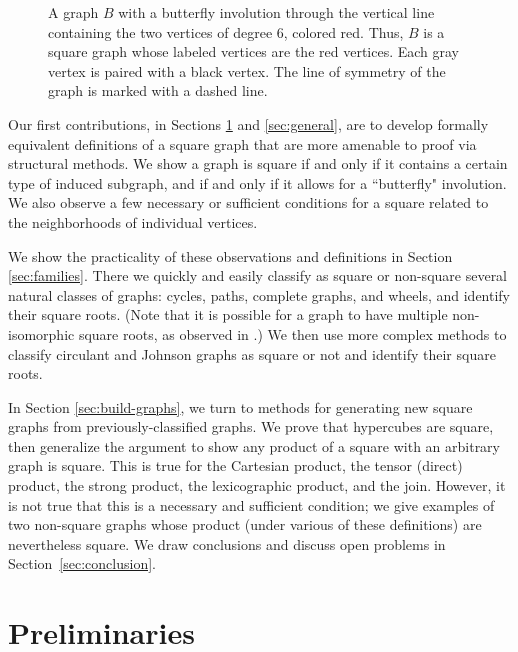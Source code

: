 \documentclass{article}
\theoremstyle{definition}
\begin{document}
\begin{figure}[htb]
    \caption{A graph $B$ with a butterfly involution through the vertical line containing the two vertices of degree 6, colored red. Thus, $B$ is a square graph whose labeled vertices are the red vertices. Each gray vertex is paired with a black vertex. The line of symmetry of the graph is marked with a dashed line.} 
    \label{fig:butterfly}
\end{figure}


Our first contributions, in Sections \ref{sec:prelims} and \ref{sec:general}, are to develop formally equivalent definitions of a square graph that are more amenable to proof via structural methods.  We show a graph is square if and only if it contains a certain type of induced subgraph, and if and only if it allows for a ``butterfly" involution. We also observe a few necessary or sufficient conditions for a square related to the neighborhoods of individual vertices.

We show the practicality of these observations and definitions in Section \ref{sec:families}. There we quickly and easily classify as square or non-square several natural classes of graphs: cycles, paths, complete graphs, and wheels, and identify their square roots.  (Note that it is possible for a graph to have multiple non-isomorphic square roots, as observed in \cite{AAP}.)  We then use more complex methods to classify circulant and Johnson graphs as square or not and identify their square roots.

In Section \ref{sec:build-graphs}, we turn to methods for generating new square graphs from previously-classified graphs.  We prove that hypercubes are square, then generalize the argument to show any product of a square with an arbitrary graph is square. This is true for the Cartesian product, the tensor (direct) product, the strong product, the lexicographic product, and the join.  However, it is not true that this is a necessary and sufficient condition; we give examples of two non-square graphs whose product (under various of these definitions) are nevertheless square. We draw conclusions and discuss open problems in Section~\ref{sec:conclusion}.

\section{Preliminaries} \label{sec:prelims}
\end{document}
